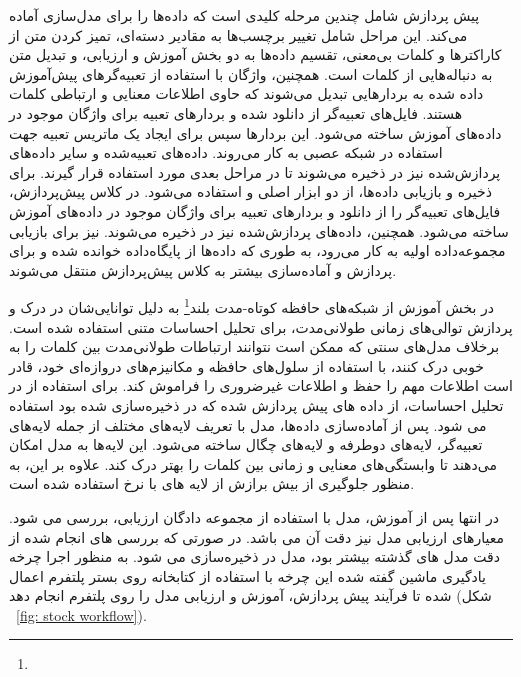 پیش پردازش شامل چندین مرحله کلیدی است که داده‌ها را برای مدل‌سازی آماده می‌کند. این مراحل شامل تغییر برچسب‌ها به مقادیر دسته‌ای، تمیز کردن متن از کاراکترها و کلمات بی‌معنی، تقسیم داده‌ها به دو بخش آموزش و ارزیابی، و تبدیل متن به دنباله‌هایی از کلمات است.  همچنین، واژگان با استفاده از تعبیه‌گرهای پیش‌آموزش داده شده  به بردارهایی تبدیل می‌شوند که حاوی اطلاعات معنایی و ارتباطی کلمات هستند. فایل‌های تعبیه‌گر  از  دانلود شده و بردارهای تعبیه برای واژگان موجود در داده‌های آموزش ساخته می‌شود. این بردارها سپس برای ایجاد یک ماتریس تعبیه جهت استفاده در شبکه عصبی به کار می‌روند. داده‌های تعبیه‌شده و سایر داده‌های پردازش‌شده نیز در  ذخیره می‌شوند تا در مراحل بعدی مورد استفاده قرار گیرند. برای ذخیره و بازیابی داده‌ها، از دو ابزار اصلی  و  استفاده می‌شود. در کلاس پیش‌پردازش، فایل‌های تعبیه‌گر  را از  دانلود و بردارهای تعبیه برای واژگان موجود در داده‌های آموزش ساخته می‌شود. همچنین، داده‌های پردازش‌شده نیز در  ذخیره می‌شوند.  نیز برای بازیابی مجموعه‌داده اولیه به کار می‌رود، به طوری که داده‌ها از پایگاه‌داده خوانده شده و برای پردازش و آماده‌سازی بیشتر به کلاس پیش‌پردازش منتقل می‌شوند. 


در بخش آموزش از شبکه‌های حافظه کوتاه-مدت بلند\footnote{} به دلیل توانایی‌شان در درک و پردازش توالی‌های زمانی طولانی‌مدت، برای تحلیل احساسات متنی استفاده شده است. برخلاف مدل‌های سنتی که ممکن است نتوانند ارتباطات طولانی‌مدت بین کلمات را به خوبی درک کنند،  با استفاده از سلول‌های حافظه و مکانیزم‌های دروازه‌ای خود، قادر است اطلاعات مهم را حفظ و اطلاعات غیرضروری را فراموش کند. برای استفاده از  در تحلیل احساسات، از داده های پیش پردازش شده که در  ذخیره‌سازی شده بود استفاده می شود. پس از آماده‌سازی داده‌ها، مدل  با تعریف لایه‌های مختلف از جمله لایه‌های تعبیه‌گر، لایه‌های  دوطرفه و لایه‌های چگال ساخته می‌شود. این لایه‌ها به مدل امکان می‌دهند تا وابستگی‌های معنایی و زمانی بین کلمات را بهتر درک کند. علاوه بر این،‌ به منظور جلوگیری از بیش برازش از لایه های  با نرخ  استفاده شده است.

در انتها پس از آموزش، مدل با استفاده از مجموعه دادگان ارزیابی، بررسی می شود. معیارهای ارزیابی مدل نیز دقت آن می باشد. در صورتی که بررسی های انجام شده از دقت مدل های گذشته بیشتر بود، مدل در  ذخیره‌سازی می شود. به منظور اجرا چرخه یادگیری ماشین گفته شده این چرخه با استفاده از کتابخانه  روی بستر پلتفرم اعمال شده تا فرآیند پیش پردازش،‌ آموزش و ارزیابی مدل را روی پلتفرم انجام دهد (شکل ~\ref{fig: stock workflow}).


